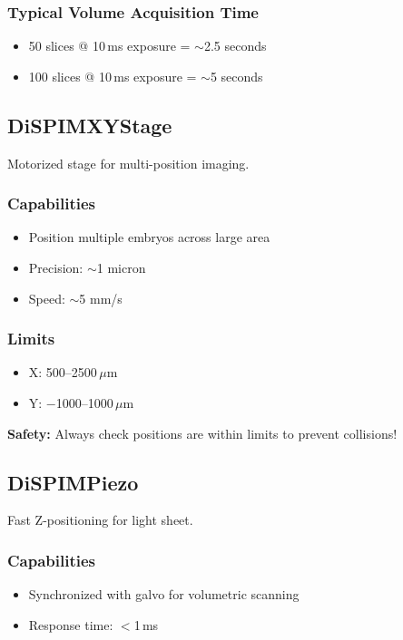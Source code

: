 \documentclass[11pt,letterpaper]{article}
\begin{document}
\subsubsection*{Typical Volume Acquisition Time}
\begin{itemize}
    \item 50 slices @ 10\,ms exposure = $\sim$2.5 seconds
    \item 100 slices @ 10\,ms exposure = $\sim$5 seconds
\end{itemize}

\subsection{DiSPIMXYStage}

Motorized stage for multi-position imaging.

\subsubsection*{Capabilities}
\begin{itemize}
    \item Position multiple embryos across large area
    \item Precision: $\sim$1 micron
    \item Speed: $\sim$5 mm/s
\end{itemize}

\subsubsection*{Limits}
\begin{itemize}
    \item X: 500--2500\,$\mu$m
    \item Y: $-$1000--1000\,$\mu$m
\end{itemize}

\textbf{Safety:} Always check positions are within limits to prevent collisions!

\subsection{DiSPIMPiezo}

Fast Z-positioning for light sheet.

\subsubsection*{Capabilities}
\begin{itemize}
    \item Synchronized with galvo for volumetric scanning
    \item Response time: $<$1\,ms
\end{itemize}
\end{document}
